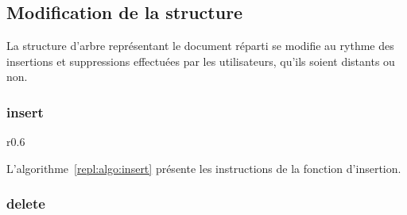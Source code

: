 \subsection{Modification de la structure}

La structure d'arbre représentant le document réparti se modifie au rythme des
insertions et suppressions effectuées par les utilisateurs, qu'ils soient
distants ou non. 

\subsubsection{insert}


\begin{wrapfigure}{r}{0.6\textwidth}
  \vspace{-35pt} %
  \begin{minipage}[t]{0.6\textwidth}
    \begin{algorithm}[H]
      
      \caption{\label{repl:algo:insert} Insert.}
    \end{algorithm}
  \end{minipage}
  \vspace{-15pt}
\end{wrapfigure}

L'algorithme~\ref{repl:algo:insert} présente les instructions de la fonction
d'insertion.


\subsubsection{delete}

